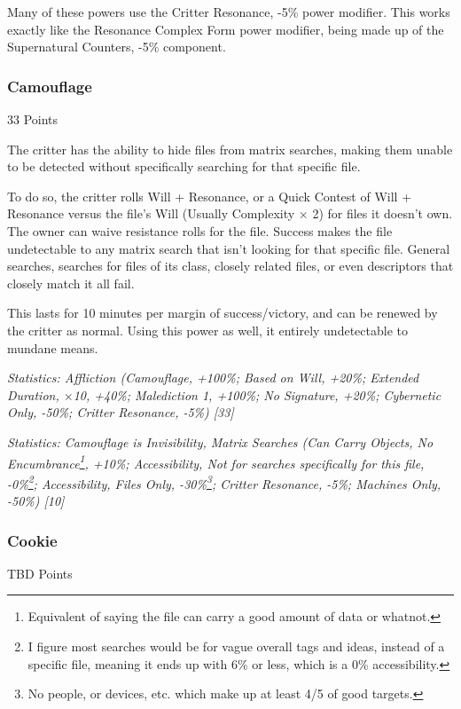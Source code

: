 \begin{multicols*}{3}
	Many of these powers use the Critter Resonance, -5\% power modifier. This works exactly like the Resonance Complex Form power modifier, being made up of the Supernatural Counters, -5\% component.
	
	\subsubsection{Camouflage}\label{camouflage}
	\begin{flushright}
		33 Points
	\end{flushright}

	The critter has the ability to hide files from matrix searches, making them unable to be detected without specifically searching for that specific file.
	
	To do so, the critter rolls Will + Resonance, or a Quick Contest of Will + Resonance versus the file's Will (Usually Complexity $\times$ 2) for files it doesn't own. The owner can waive resistance rolls for the file. Success makes the file undetectable to any matrix search that isn't looking for that specific file. General searches, searches for files of its class, closely related files, or even descriptors that closely match it all fail.
	
	This lasts for 10 minutes per margin of success/victory, and can be renewed by the critter as normal. Using this power as well, it entirely undetectable to mundane means.

	\textcolor{OliveGreen}{\textit{Statistics: Affliction (Camouflage, +100\%; Based on Will, +20\%; Extended Duration, $\times$10, +40\%; Malediction 1, +100\%; No Signature, +20\%; Cybernetic Only, -50\%; Critter Resonance, -5\%) [33]}}
	
	\textcolor{OliveGreen}{\textit{Statistics: Camouflage is Invisibility, Matrix Searches (Can Carry Objects, No Encumbrance\footnote{Equivalent of saying the file can carry a good amount of data or whatnot.}, +10\%; Accessibility, Not for searches specifically for this file, -0\%\footnote{I figure most searches would be for vague overall tags and ideas, instead of a specific file, meaning it ends up with 6\% or less, which is a 0\% accessibility.}; Accessibility, Files Only, -30\%\footnote{No people, or devices, etc. which make up at least 4/5 of good targets.}; Critter Resonance, -5\%; Machines Only, -50\%) [10] }}
	 
	\subsubsection{Cookie}\label{cookie}
	\begin{flushright}
		TBD Points
	\end{flushright}


\end{multicols*}
